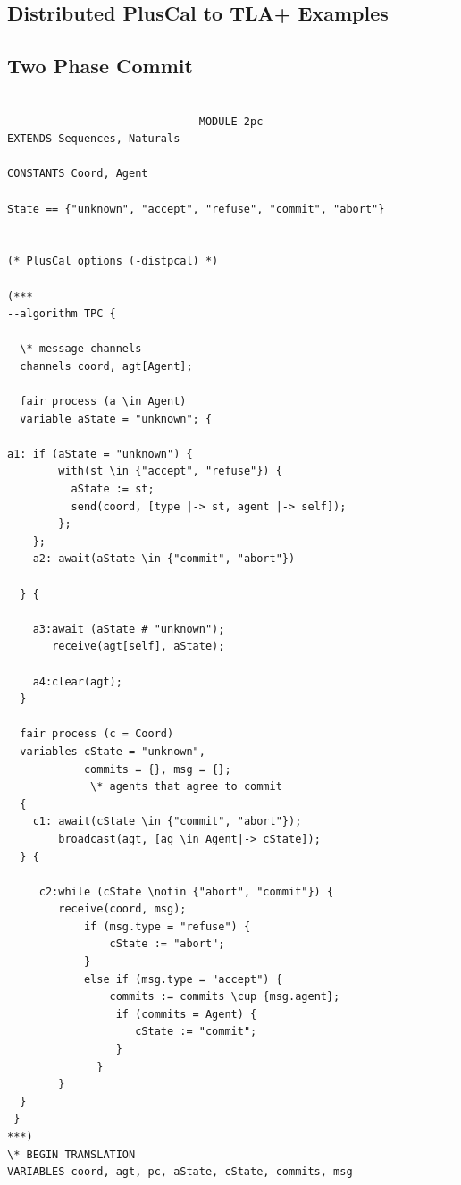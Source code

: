 \documentclass{thesul}
\begin{document}
\begin{appendices}
\chapter{Distributed PlusCal to TLA+ Examples}
\label{appendix:examples}
\section{Two Phase Commit}

\begin{lstlisting}[caption = TLA+ translation for Sub-Processes, frame = tlrb, firstnumber = 1]

----------------------------- MODULE 2pc -----------------------------
EXTENDS Sequences, Naturals

CONSTANTS Coord, Agent

State == {"unknown", "accept", "refuse", "commit", "abort"}

    
(* PlusCal options (-distpcal) *)

(***
--algorithm TPC {
 
  \* message channels
  channels coord, agt[Agent];
     
  fair process (a \in Agent)
  variable aState = "unknown"; {

a1: if (aState = "unknown") {
        with(st \in {"accept", "refuse"}) {
          aState := st;
          send(coord, [type |-> st, agent |-> self]);
        };
    };
    a2: await(aState \in {"commit", "abort"})
    
  } {
    
    a3:await (aState # "unknown");
       receive(agt[self], aState); 
       
    a4:clear(agt);
  }

  fair process (c = Coord) 
  variables cState = "unknown",
            commits = {}, msg = {};
             \* agents that agree to commit
  {
    c1: await(cState \in {"commit", "abort"});    
        broadcast(agt, [ag \in Agent|-> cState]);
  } {
        
     c2:while (cState \notin {"abort", "commit"}) {
        receive(coord, msg);
            if (msg.type = "refuse") {
                cState := "abort";
            }
            else if (msg.type = "accept") {
                commits := commits \cup {msg.agent};
                 if (commits = Agent) {
                    cState := "commit";
                 }
              }
        }
  }
 }
***)
\* BEGIN TRANSLATION
VARIABLES coord, agt, pc, aState, cState, commits, msg


\end{lstlisting}
\end{appendices}
\end{document}
